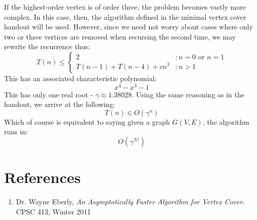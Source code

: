 \documentclass{article}
\begin{document}
If the highest-order vertex is of order three, the problem becomes vastly more
complex. In this case, then, the algorithm defined in the minimal vertex cover
handout will be used. However, since we need not worry about cases where only
two or three vertices are removed when recursing the second time, we may
rewrite the recurrence thus:
\begin{displaymath}
T(n) \leq \left\{
	\begin{array}{lr}
	2 & : n=0\text{ or }n=1 \\
	T(n-1) + T(n-4) + cn^3 	& : n>1
	\end{array}
	\right.
\end{displaymath}
This has an associated characteristic polynomial:
\begin{equation*}
x^4 - x^3 - 1
\end{equation*}
This has only one real root - $\gamma \approx 1.38028$. Using the same reasoning
as in the handout, we arrive at the following:
\begin{equation*}
T(n) \in O(\gamma^n)
\end{equation*}
Which of course is equivalent to saying given a graph $G(V,E)$, the algorithm
runs in:
\begin{equation*}
O\left( \gamma^{|V|} \right)
\end{equation*}

\section{References}

\begin{enumerate}
\item Dr. Wayne Eberly, \textit{An Asymptotically Faster Algorithm for Vertex
Cover}. CPSC 413, Winter 2011
\end{enumerate}
\end{document}
